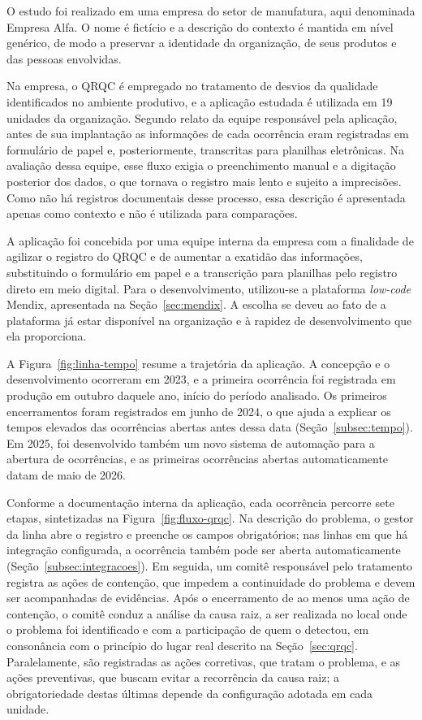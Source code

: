 O estudo foi realizado em uma empresa do setor de manufatura, aqui denominada Empresa Alfa. O nome é fictício e a descrição do contexto é mantida em nível genérico, de modo a preservar a identidade da organização, de seus produtos e das pessoas envolvidas.

Na empresa, o QRQC é empregado no tratamento de desvios da qualidade identificados no ambiente produtivo, e a aplicação estudada é utilizada em 19 unidades da organização. Segundo relato da equipe responsável pela aplicação, antes de sua implantação as informações de cada ocorrência eram registradas em formulário de papel e, posteriormente, transcritas para planilhas eletrônicas. Na avaliação dessa equipe, esse fluxo exigia o preenchimento manual e a digitação posterior dos dados, o que tornava o registro mais lento e sujeito a imprecisões. Como não há registros documentais desse processo, essa descrição é apresentada apenas como contexto e não é utilizada para comparações.

A aplicação foi concebida por uma equipe interna da empresa com a finalidade de agilizar o registro do QRQC e de aumentar a exatidão das informações, substituindo o formulário em papel e a transcrição para planilhas pelo registro direto em meio digital. Para o desenvolvimento, utilizou-se a plataforma \textit{low-code} Mendix, apresentada na Seção~\ref{sec:mendix}. A escolha se deveu ao fato de a plataforma já estar disponível na organização e à rapidez de desenvolvimento que ela proporciona.

A Figura~\ref{fig:linha-tempo} resume a trajetória da aplicação. A concepção e o desenvolvimento ocorreram em 2023, e a primeira ocorrência foi registrada em produção em outubro daquele ano, início do período analisado. Os primeiros encerramentos foram registrados em junho de 2024, o que ajuda a explicar os tempos elevados das ocorrências abertas antes dessa data (Seção~\ref{subsec:tempo}). Em 2025, foi desenvolvido também um novo sistema de automação para a abertura de ocorrências, e as primeiras ocorrências abertas automaticamente datam de maio de 2026.



Conforme a documentação interna da aplicação, cada ocorrência percorre sete etapas, sintetizadas na Figura~\ref{fig:fluxo-qrqc}. Na descrição do problema, o gestor da linha abre o registro e preenche os campos obrigatórios; nas linhas em que há integração configurada, a ocorrência também pode ser aberta automaticamente (Seção~\ref{subsec:integracoes}). Em seguida, um comitê responsável pelo tratamento registra as ações de contenção, que impedem a continuidade do problema e devem ser acompanhadas de evidências. Após o encerramento de ao menos uma ação de contenção, o comitê conduz a análise da causa raiz, a ser realizada no local onde o problema foi identificado e com a participação de quem o detectou, em consonância com o princípio do lugar real descrito na Seção~\ref{sec:qrqc}. Paralelamente, são registradas as ações corretivas, que tratam o problema, e as ações preventivas, que buscam evitar a recorrência da causa raiz; a obrigatoriedade destas últimas depende da configuração adotada em cada unidade.

